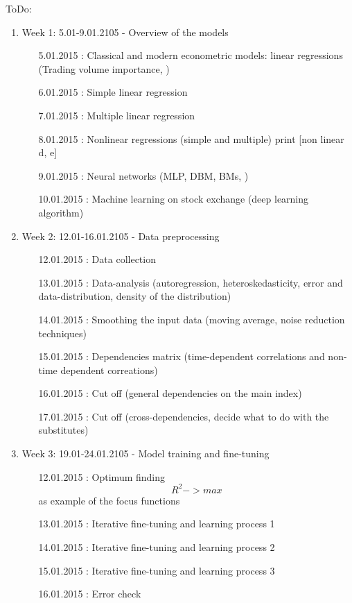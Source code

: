 \documentclass {article}
\begin{document}
ToDo:
\begin{enumerate}
	\item Week 1: 5.01-9.01.2105 - Overview of the models 
	\begin{enumerate}
		\item[5.01.2015]: Classical and modern econometric models:  linear regressions (Trading volume importance, ) 
		\item[6.01.2015]: Simple linear regression 	 		  
		\item[7.01.2015]: Multiple linear regression  
		\item[8.01.2015]: Nonlinear regressions (simple and multiple) print [non linear d, e]  
		\item[9.01.2015]: Neural networks (MLP, DBM, BMs, )
		\item[10.01.2015]: Machine learning on stock exchange (deep learning algorithm)
	\end{enumerate}
	\item Week 2: 12.01-16.01.2105 - Data preprocessing
	\begin{enumerate}
		\item[12.01.2015]: Data collection 
		\item[13.01.2015]: Data-analysis (autoregression, heteroskedasticity, error and data-distribution, density of the distribution)
		\item[14.01.2015]: Smoothing the input data (moving average, noise reduction techniques)
		\item[15.01.2015]: Dependencies matrix  (time-dependent correlations and non-time dependent correations)
		\item[16.01.2015]: Cut off (general dependencies on the main index)
		\item[17.01.2015]: Cut off (cross-dependencies, decide what to do with the substitutes)
	\end{enumerate}
	\item Week 3: 19.01-24.01.2105 - Model training and fine-tuning
	\begin{enumerate}
		\item[12.01.2015]: Optimum finding  \[ R^2 -> max \] as example of the focus functions
		\item[13.01.2015]: Iterative fine-tuning and learning process 1
		\item[14.01.2015]: Iterative fine-tuning and learning process 2
		\item[15.01.2015]: Iterative fine-tuning and learning process 3
		\item[16.01.2015]: Error check

\end{enumerate}
\end{enumerate}
\end{document}
